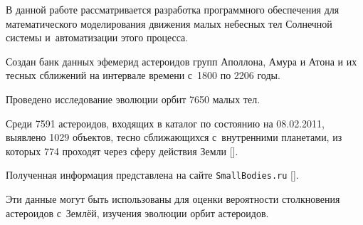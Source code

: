 








\date{22/IV/2011}








\maketitle



\small



В данной работе рассматривается разработка программного обеспечения для математического моделирования движения малых небесных тел Солнечной системы и~автоматизации этого процесса.



Создан банк данных эфемерид астероидов групп Аполлона, Амура и Атона и их тесных сближений на интервале времени с~1800 по 2206 годы. 

Проведено исследование эволюции орбит 7650 малых тел.

Среди 7591 астероидов, входящих в каталог по состоянию на 08.02.2011, выявлено 1029 объектов, тесно сближающихся с~внутренними планетами, из которых 774 проходят через сферу действия Земли []. 

Полученная информация представлена на сайте {\tt SmallBodies.ru} []. 

Эти данные могут быть использованы для оценки вероятности столкновения астероидов с~Землёй, изучения эволюции орбит астероидов. 



